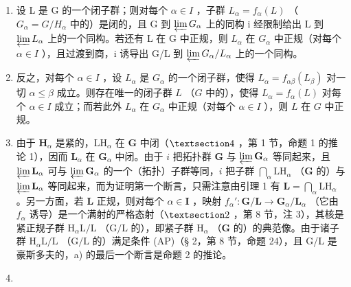 \begin{enumerate}
\def\labelenumi{\alph{enumi})}
\item
  设 L 是 G 的一个闭子群；则对每个 \(\alpha\in I\) ，子群 \(L_{\alpha}=f_{\alpha}(L)\) （\(G_{\alpha}=G/H_{\alpha}\) 中的）是闭的，且 G 到 \(\varprojlim G_{\alpha}\) 上的同构 i 经限制给出 L 到 \(\varprojlim L_{\alpha}\) 上的一个同构。若还有 L 在 G 中正规，则 \(L_{\alpha}\) 在 \(G_{\alpha}\) 中正规（对每个 \(\alpha\in I\) ），且过渡到商，i 诱导出 G/L 到 \(\varprojlim G_{\alpha}/L_{\alpha}\) 上的一个同构。
\item
  反之，对每个 \(\alpha \in I\) ，设 \(L_{\alpha}\) 是 \(G_{\alpha}\) 的一个闭子群，使得 \(L_{\alpha} = f_{\alpha \beta}(L_{\beta})\) 对一切 \(\alpha \leqslant \beta\) 成立。则存在唯一的闭子群 \(L\) （\(G\) 中的），使得 \(L_{\alpha} = f_{\alpha}(L)\) 对每个 \(\alpha \in I\) 成立；而若此外 \(L_{\alpha}\) 在 \(G_{\alpha}\) 中正规（对每个 \(\alpha \in I\) ），则 \(L\) 在 \(G\) 中正规。
\item
  由于 \(\mathbf{H}_{\alpha}\) 是紧的，\(\mathrm{LH}_{\alpha}\) 在 \(\mathbf{G}\) 中闭（\(\S 4\) ，第 1 节，命题 1 的推论 1），因而 \(\mathbf{L}_{\alpha}\) 在 \(\mathbf{G}_{\alpha}\) 中闭。由于 \(i\) 把拓扑群 \(\mathbf{G}\) 与 \(\varprojlim \mathbf{G}_{\alpha}\) 等同起来，且 \(\varprojlim \mathbf{L}_{\alpha}\) 可与 \(\varprojlim \mathbf{G}_{\alpha}\) 的一个（拓扑）子群等同，\(i\) 把子群 \(\bigcap_{\alpha} \mathrm{LH}_{\alpha}\) （\(\mathbf{G}\) 的）与 \(\varprojlim \mathbf{L}_{\alpha}\) 等同起来，而为证明第一个断言，只需注意由引理 1 有 \(\mathbf{L} = \bigcap_{\alpha} \mathrm{LH}_{\alpha}\) 。另一方面，若 \(\mathbf{L}\) 正规，则对每个 \(\alpha \in \mathbf{I}\) ，映射 \(f_{\alpha}': \mathbf{G} / \mathbf{L} \to \mathbf{G}_{\alpha} / \mathbf{L}_{\alpha}\) （它由 \(f_{\alpha}\) 诱导）是一个满射的严格态射（\(\S 2\) ，第 8 节，注 3），其核是紧正规子群 \(\mathrm{H}_{\alpha} \mathrm{L} / \mathrm{L}\) （\(\mathrm{G} / \mathrm{L}\) 的），即紧子群 \(\mathrm{H}_{\alpha}\) （\(\mathbf{G}\) 的）的典范像。由于诸子群 \(\mathrm{H}_{\alpha} \mathrm{L} / \mathrm{L}\) （\(\mathrm{G} / \mathrm{L}\) 的）满足条件 (AP)（§ 2，第 8 节，命题 24），且 G/L 是豪斯多夫的，a) 的最后一个断言是命题 2 的推论。
\item

\end{enumerate}
